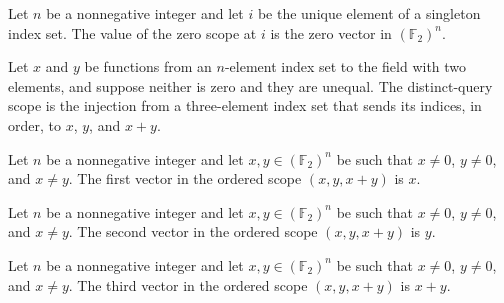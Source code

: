 \begin{theorem}
\label{FABL.blrZeroCSPScope_apply}
\leanok
{}
Let $n$ be a nonnegative integer and let $i$ be the unique element of a singleton index
set. The value of the zero scope at $i$ is the zero vector in $(\mathbb F_2)^n$.
\end{theorem}

\begin{definition}
\label{FABL.blrDistinctCSPScope}
\leanok
{}
Let $x$ and $y$ be functions from an $n$-element index set to the field with two
elements, and suppose neither is zero and they are unequal. The distinct-query scope is
the injection from a three-element index set that sends its indices, in order, to $x$,
$y$, and $x+y$.
\end{definition}

\begin{theorem}
\label{FABL.blrDistinctCSPScope_zero}
\leanok
{}
Let $n$ be a nonnegative integer and let $x,y\in(\mathbb F_2)^n$ be such that $x\ne0$,
$y\ne0$, and $x\ne y$. The first vector in the ordered scope $(x,y,x+y)$ is $x$.
\end{theorem}

\begin{theorem}
\label{FABL.blrDistinctCSPScope_one}
\leanok
{}
Let $n$ be a nonnegative integer and let $x,y\in(\mathbb F_2)^n$ be such that $x\ne0$,
$y\ne0$, and $x\ne y$. The second vector in the ordered scope $(x,y,x+y)$ is $y$.
\end{theorem}

\begin{theorem}
\label{FABL.blrDistinctCSPScope_two}
\leanok
{}
Let $n$ be a nonnegative integer and let $x,y\in(\mathbb F_2)^n$ be such that $x\ne0$,
$y\ne0$, and $x\ne y$. The third vector in the ordered scope $(x,y,x+y)$ is $x+y$.
\end{theorem}


